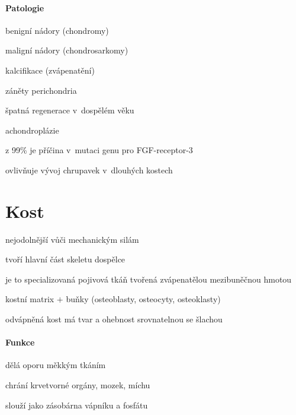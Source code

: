 \documentclass[DIV=8]{scrreprt}
\begin{document}
\paragraph{Patologie}
\begin{myItemize}[nosep]
    \item benigní nádory (chondromy)
    \item maligní nádory (chondrosarkomy)
    \item kalcifikace (zvápenatění)
    \item záněty perichondria
    \item špatná regenerace v dospělém věku
    \item achondroplázie
\begin{myItemize}[nosep]
    \item z 99\% je příčina v mutaci genu pro FGF-receptor-3
    \item ovlivňuje vývoj chrupavek v dlouhých kostech
\end{myItemize}

\end{myItemize}



\section{Kost} \label{Kost} \FloatBarrier


\begin{myItemize}[nosep]
    \item nejodolnější vůči mechanickým silám
    \item tvoří hlavní část skeletu dospělce
    \item je to specializovaná pojivová tkáň tvořená zvápenatělou mezibuněčnou hmotou
\begin{myItemize}[nosep]
    \item kostní matrix \(+\) buňky (osteoblasty, osteocyty, osteoklasty)
    \item odvápněná kost má tvar a ohebnost srovnatelnou se šlachou
\end{myItemize}

\end{myItemize}




\paragraph{Funkce}
\begin{myItemize}[nosep]
    \item dělá oporu měkkým tkáním
    \item chrání krvetvorné orgány, mozek, míchu
    \item slouží jako zásobárna vápníku a fosfátu
\end{myItemize}
\end{document}
